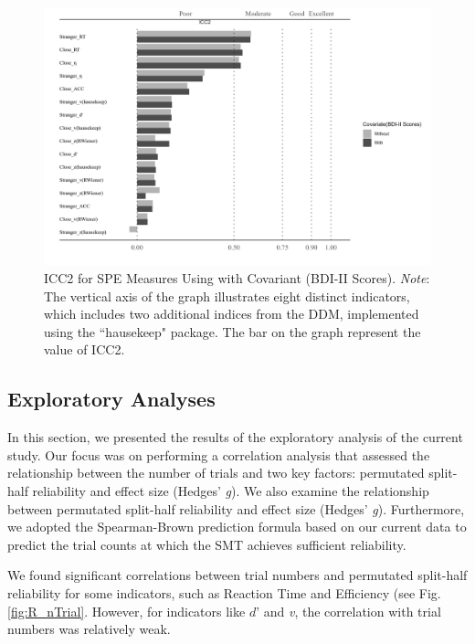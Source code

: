\documentclass[sn-apa]{sn-jnl}%
\theoremstyle{thmstyleone}%
\theoremstyle{thmstyletwo}%
\theoremstyle{thmstylethree}%
\begin{document}
\begin{figure}[!ht]
	\centering
	\includegraphics[width=1.1\textwidth]{./Figure/Fig5_BDI_cov.png}
	\caption[ICC2 for SPE Measures Using \textcite{hu2023data} with Covariant (BDI-II Scores)]{ICC2 for SPE Measures Using \textcite{hu2023data} with Covariant (BDI-II Scores).  \textit{Note}: The vertical axis of the graph illustrates eight distinct indicators, which includes two additional indices from the DDM, implemented using the ``hausekeep" package. The bar on the graph represent the value of ICC2.
	}\label{fig:BDI_cov_Result}
\end{figure}


\subsection{Exploratory Analyses}\label{sec:Exploratory}

In this section, we presented the results of the exploratory analysis of the current study. Our focus was on performing a correlation analysis that assessed the relationship between the number of trials and two key factors: permutated split-half reliability and effect size (Hedges’\textit{ g}). We also examine the relationship between permutated split-half reliability and effect size (Hedges’ \textit{g}). Furthermore, we adopted the Spearman-Brown prediction formula based on our current data to predict the trial counts at which the SMT achieves sufficient reliability.

We found significant correlations between trial numbers and permutated split-half reliability for some indicators, such as Reaction Time and Efficiency (see Fig. \ref{fig:R_nTrial}. However, for indicators like $d’$ and \textit{v}, the correlation with trial numbers was relatively weak. 
\end{document}
